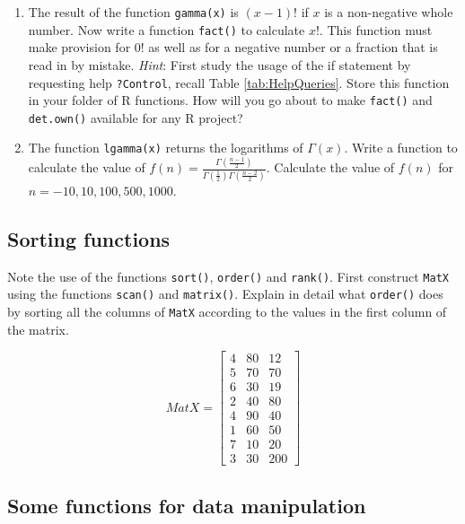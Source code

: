 \documentclass[
]{book}
\begin{document}
\begin{enumerate}
\def\labelenumi{(\alph{enumi})}
\setcounter{enumi}{14}
\item
  The result of the function \texttt{gamma(x)} is \((x-1)!\) if \(x\) is a non-negative whole number. Now write a function \texttt{fact()} to calculate \(x!\). This function must make provision for \(0!\) as well as for a negative number or a fraction that is read in by mistake. \emph{Hint}: First study the usage of the if statement by requesting help \texttt{?Control}, recall Table \ref{tab:HelpQueries}. Store this function in your folder of R functions. How will you go about to make \texttt{fact()} and \texttt{det.own()} available for any R project?
\item
  The function \texttt{lgamma(x)} returns the logarithms of \(\Gamma(x)\). Write a function to calculate the value of \(f(n) = \frac{\Gamma(\frac{n-1}{2})}{\Gamma(\frac{1}{2})\Gamma(\frac{n-2}{2})}\). Calculate the value of \(f(n)\) for \(n = -10, 10, 100, 500, 1000\).
\end{enumerate}

\subsection{Sorting functions}\label{sorting-functions}

Note the use of the functions \texttt{sort()}, \texttt{order()} and \texttt{rank()}. First construct \texttt{MatX} using the functions \texttt{scan()} and \texttt{matrix()}. Explain in detail what \texttt{order()} does by sorting all the columns of \texttt{MatX} according to the values in the first column of the matrix.

\[
MatX = \begin{bmatrix}
         4 & 80 & 12\\
         5 & 70 & 70\\
         6 & 30 & 19\\
         2 & 40 & 80\\
         4 & 90 & 40\\
         1 & 60 & 50\\
         7 & 10 & 20\\
         3 & 30 & 200
       \end{bmatrix}
\]

\subsection{Some functions for data manipulation}\label{some-functions-for-data-manipulation}
\end{document}
